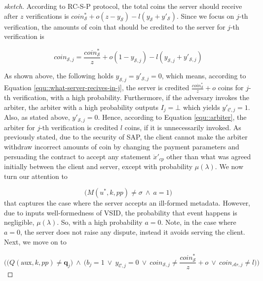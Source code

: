 \begin{proof}[sketch]
According to  RC-S-P protocol, the total coins the server should receive after $z$ verifications is $coin^{\scriptscriptstyle *}_{\scriptscriptstyle\mathcal S}+o(z-y_{\scriptscriptstyle\mathcal S})-l(y_{\scriptscriptstyle\mathcal S}+y'_{\scriptscriptstyle\mathcal S})$. Since we focus on  $j$-th verification, the amounts of  coin that should be credited to the server for $j$-th verification is
  
  \begin{equation}\label{equ::what-server-recives-in-j}
   coin_{\scriptscriptstyle\mathcal{S},j}=\frac{coin^{\scriptscriptstyle *}_{\scriptscriptstyle\mathcal S}}{z}+o(1-y_{\scriptscriptstyle\mathcal {S},j})-l(y_{\scriptscriptstyle\mathcal {S},j}+y'_{\scriptscriptstyle\mathcal {S},j})
     \end{equation}

 
 
 
  As shown above, the following holds $y_{\scriptscriptstyle\mathcal{S},j}=y'_{\scriptscriptstyle\mathcal{S},j}=0$, which   means, according to  Equation \ref{equ::what-server-recives-in-j}, the server is credited $\frac{coin_{\scriptscriptstyle\mathcal S}^{\scriptscriptstyle*}}{z}+o$ coins for $j$-th verification, with a  high probability.  Furthermore, if the adversary invokes the arbiter, the arbiter with a high probability outputs $I_{\scriptscriptstyle j}=\bot$ which yields  $y'_{\scriptscriptstyle\mathcal{C},j}=1$. Also, as stated above,   $y'_{\scriptscriptstyle\mathcal{S},j}=0$.   Hence, according to Equation \ref{equ::arbiter}, the arbiter for $j$-th verification is credited $l$ coins, if it is unnecessarily invoked.  As previously stated,  due to the security of SAP, the client cannot make the arbiter withdraw incorrect amounts of coin by changing the payment parameters  and persuading the contract to accept any statement $\ddot{x}'_{\scriptscriptstyle cp}$ other than what was agreed initially between the client and server, except with  probability $\mu(\lambda)$. We now turn our attention to 
  
  $$\Big(M(u^{\scriptscriptstyle *},k,{pp})\neq \sigma\ \wedge \ a=1\Big)$$
     that captures the case where the server accepts an ill-formed metadata. However, due to inputs well-formedness of VSID, the probability that event happens is negligible, $\mu(\lambda)$. So, with a high probability $a=0$.  Note, in the  case where $a=0$, the server does not raise any dispute, instead it avoids serving the client. Next, we move on to 
     
     $$\Bigg(\Big(Q(\text{aux},k,{pp})\neq \bm{q}_{\scriptscriptstyle j}\Big)\ \wedge \ \Big(b_{\scriptscriptstyle j}=1\ \vee \ y_{\scriptscriptstyle\mathcal{C},j}=0 \ \vee \ coin_{\scriptscriptstyle\mathcal{S},j}\neq \frac{coin_{\scriptscriptstyle\mathcal S}^{\scriptscriptstyle*}}{z}+o \ \vee \ coin_{\scriptscriptstyle\mathcal{A}r,j}\neq l\Big)\Bigg)$$
     

\end{proof}
